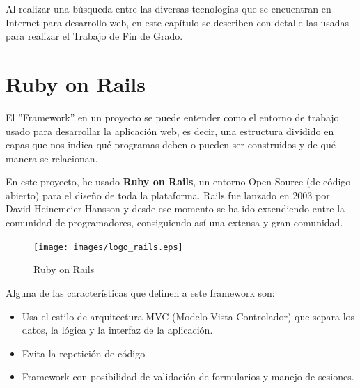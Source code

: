 
Al realizar una búsqueda entre las diversas tecnologías que se encuentran en Internet para desarrollo web, en este capítulo se describen con detalle las usadas para realizar el Trabajo de Fin de Grado.


\section{Ruby on Rails}
\label{3:sec:1}

El ''Framework'' en un proyecto se puede entender como el entorno de trabajo usado para desarrollar la aplicación web, es decir, una estructura dividido en capas que nos indica qué programas deben o pueden ser construidos y de qué manera se relacionan.

En este proyecto, he usado \textbf{Ruby on Rails}\cite{Rails}, un entorno Open Source (de código abierto) para el diseño de toda la plataforma. Rails fue lanzado en 2003 por David Heinemeier Hansson y desde ese momento se ha ido extendiendo entre la comunidad de programadores, consiguiendo así una extensa y gran comunidad.

\begin{figure}[!th]
\begin{center}
\texttt{[image: images/logo\_rails.eps]}
\caption{Ruby on Rails}
\label{fig:4}
\end{center}
\end{figure}

Alguna de las características que definen a este framework son:

\begin{itemize}
    \item Usa el estilo de arquitectura MVC (Modelo Vista Controlador) que separa los datos, la lógica y la interfaz de la aplicación.
    \item Evita la repetición de código
    \item Framework con posibilidad de validación de formularios y manejo de sesiones.
\end{itemize}


